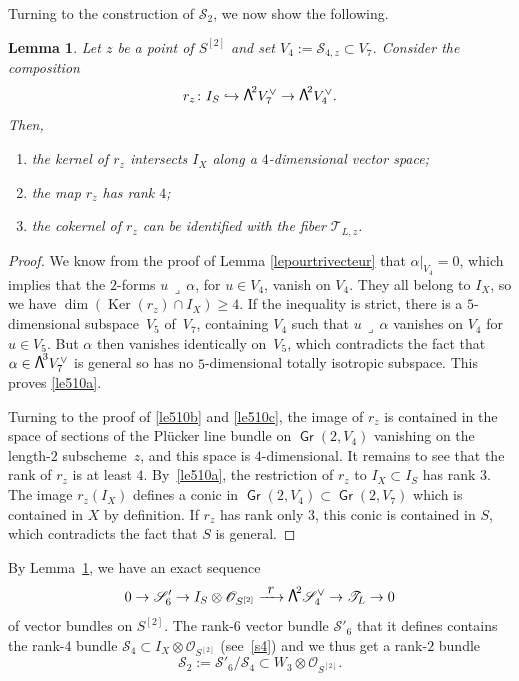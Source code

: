 \documentclass[JEP,XML,SOM,Unicode, NoEqCountersInSection,NoFloatCountersInSection]{cedram}
\let\mathcal\mathscr
\newenvironment{enumeratea}
{\bgroup\def\theenumi{\alph{enumi}}\def\theenumii{\arabic{enumii}}\begin{enumerate}}
{\end{enumerate}\egroup}
\newcommand\hto{\mathrel{\lhook\joinrel\to}}
\newcommand\To[1]{\mathchoice{\xrightarrow{\textstyle\kern4pt#1\kern3pt}}{\stackrel{#1}{\longrightarrow}}{}{}}
\newtheorem{lemm}{Lemma}[section]
\theoremstyle{definition}
\newcommand\cO{\mathcal{O}}\let\OO\cO
\newcommand\cS{\mathcal{S}}\let\soustauto\cS
\newcommand\cT{\mathcal{T}}
\DeclareMathOperator{\Gr}{\mathsf{Gr}}
\let\dual\vee
\DeclareMathOperator{\Ker}{Ker}
\newcommand\bw[1]{{\hbox{\large$\mathsf{\Lambda}$}^{\!#1}}}
\newcommand\hilbS{S^{[2]}}
\begin{document}
Turning to the construction of
$\cS_2$, we now show the following.

\begin{lemm} \label{le510}
Let $z$ be a point of $\hilbS$ and set
$V_4:=\cS_{4,z}\subset V_7$. Consider the composition
\[
r_z\colon I_S\hto \bw2V_7^\dual\to \bw2V_4^\dual.
\]
Then,
\begin{enumeratea}
\item\label{le510a}
the kernel of $r_z$ intersects $I_X$ along a $4$-dimensional vector
space;
\item\label{le510b}
the map
$r_z$ has rank $4$;
\item\label{le510c}
the cokernel of
$r_z$ can be identified with the fiber $\cT_{L,z}$.
\end{enumeratea}
\end{lemm}

\begin{proof} We know from the proof of Lemma \ref{lepourtrivecteur}
that $\alpha\vert_{V_4}=0$, which implies that the $2$-forms
$u\,\lrcorner\,\alpha$, for $u\in V_4$, vanish on $V_4$. They all belong to $I_X$, so we have
$\dim (\Ker (r_z)\cap I_X)\geq 4$. If the inequality is strict, there is a $5$-dimensional subspace~$V_5$ of~$V_7$, containing $V_4$ such that $u\,\lrcorner\,\alpha$ vanishes on $V_4$ for $u\in V_5$. But
$\alpha$ then vanishes identically on~$V_5$, which contradicts the fact that $\alpha\in \bw3 V_7^\dual$ is general so has no
$5$-dimensional totally isotropic subspace. This proves \eqref{le510a}.

Turning to the proof of \eqref{le510b} and \eqref{le510c}, the image of $r_z$ is contained in the space of sections of the Plücker line bundle on $\Gr(2,V_4)$ vanishing on the length-$2$ subscheme~$z$, and this space is $4$-dimensional. It remains to see that the rank of $r_z$ is at least $4$.
By~\eqref{le510a}, the restriction of $r_z$ to $I_X\subset I_S$ has rank $3$. The image $r_z(I_X)$ defines a conic in
$\Gr(2,V_4 )\subset \Gr(2,V_7 )$ which is contained in $X$ by definition.
If $r_z$ has rank only $3$,
this conic is contained in $S$, which contradicts the fact that $S$ is general.
\end{proof}

By Lemma~\ref{le510}, we have an exact sequence
\begin{equation}\label{eq20}
0\to \cS'_6\to I_S\otimes \cO_{\hilbS}\To{r} \bw2\cS_4^\vee
\to \cT_{L}\to 0
\end{equation}
of vector bundles on $\hilbS$. The rank-$6$ vector bundle $\cS'_6$ that it defines
contains the rank-$4$ bundle
$\cS_4\subset I_X\otimes \cO_{\hilbS}$ (see~\eqref{s4}) and we thus get a rank-$2$
bundle
\[
\cS_2:=\cS'_6/\cS_4\subset W_3\otimes \cO_{\hilbS}.
\]
\end{document}
